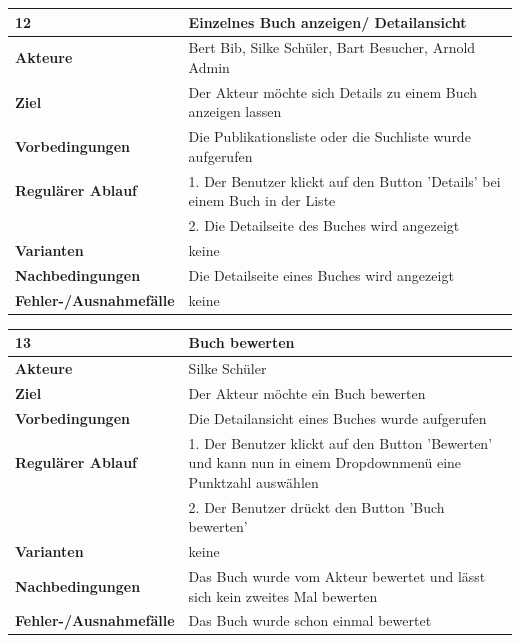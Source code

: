 \documentclass[fontsize=12pt,paper=a4,twoside]{scrartcl}
\begin{document}
\newpage
\begin{table}[htbp]
\label{12}
\begin{tabular}{|l|p{10cm}|}
\hline 
\textbf{12} & \textbf{Einzelnes Buch anzeigen/ Detailansicht} \\ \hline
\textbf{Akteure} & Bert Bib, Silke Schüler, Bart Besucher, Arnold Admin\\ \hline
\textbf{Ziel} & Der Akteur möchte sich Details zu einem Buch anzeigen lassen \\ \hline
\textbf{Vorbedingungen} & Die Publikationsliste oder die Suchliste wurde aufgerufen \\ \hline
\textbf{Regulärer Ablauf} & 
1. Der Benutzer klickt auf den Button 'Details' bei einem Buch in der Liste \\
&2. Die Detailseite des Buches wird angezeigt\\
\hline
\textbf{Varianten} & 
keine \\ \hline
\textbf{Nachbedingungen} & Die Detailseite eines Buches wird angezeigt\\ \hline
\textbf{Fehler-/Ausnahmefälle} & keine\\
\hline
\end{tabular}
\end{table}



\newpage
\begin{table}[htbp]
\label{13}
\begin{tabular}{|l|p{10cm}|}
\hline 
\textbf{13} & \textbf{Buch bewerten} \\ \hline
\textbf{Akteure} & Silke Schüler\\ \hline
\textbf{Ziel} & Der Akteur möchte ein Buch bewerten \\ \hline
\textbf{Vorbedingungen} & Die Detailansicht eines Buches wurde aufgerufen \\ \hline
\textbf{Regulärer Ablauf} & 
1. Der Benutzer klickt auf den Button 'Bewerten' und kann nun in einem Dropdownmenü eine Punktzahl 
auswählen\\
&2. Der Benutzer drückt den Button 'Buch bewerten'\\
\hline
\textbf{Varianten} & 
keine \\ \hline
\textbf{Nachbedingungen} & Das Buch wurde vom Akteur bewertet und lässt sich kein zweites Mal 
bewerten\\ \hline
\textbf{Fehler-/Ausnahmefälle} & Das Buch wurde schon einmal bewertet\\
\hline
\end{tabular}
\end{table}
\end{document}
